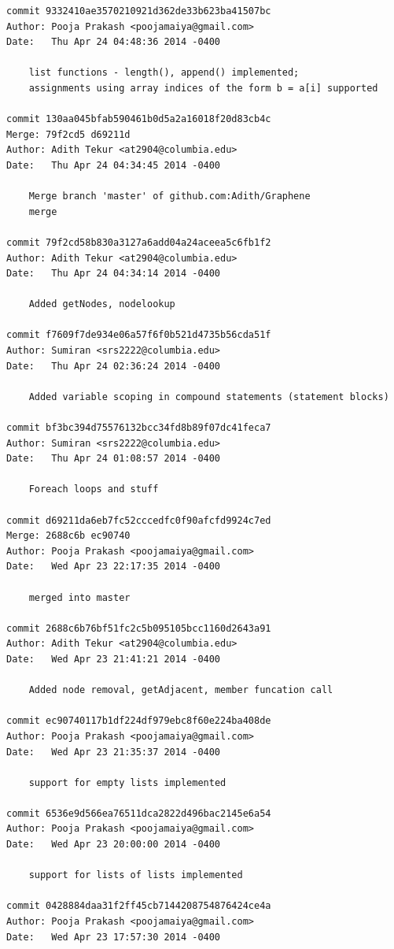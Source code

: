 \documentclass[a4paper]{article}
\begin{document}
\begin{verbatim}
commit 9332410ae3570210921d362de33b623ba41507bc
Author: Pooja Prakash <poojamaiya@gmail.com>
Date:   Thu Apr 24 04:48:36 2014 -0400

    list functions - length(), append() implemented; 
    assignments using array indices of the form b = a[i] supported

commit 130aa045bfab590461b0d5a2a16018f20d83cb4c
Merge: 79f2cd5 d69211d
Author: Adith Tekur <at2904@columbia.edu>
Date:   Thu Apr 24 04:34:45 2014 -0400

    Merge branch 'master' of github.com:Adith/Graphene
    merge

commit 79f2cd58b830a3127a6add04a24aceea5c6fb1f2
Author: Adith Tekur <at2904@columbia.edu>
Date:   Thu Apr 24 04:34:14 2014 -0400

    Added getNodes, nodelookup

commit f7609f7de934e06a57f6f0b521d4735b56cda51f
Author: Sumiran <srs2222@columbia.edu>
Date:   Thu Apr 24 02:36:24 2014 -0400

    Added variable scoping in compound statements (statement blocks)

commit bf3bc394d75576132bcc34fd8b89f07dc41feca7
Author: Sumiran <srs2222@columbia.edu>
Date:   Thu Apr 24 01:08:57 2014 -0400

    Foreach loops and stuff

commit d69211da6eb7fc52cccedfc0f90afcfd9924c7ed
Merge: 2688c6b ec90740
Author: Pooja Prakash <poojamaiya@gmail.com>
Date:   Wed Apr 23 22:17:35 2014 -0400

    merged into master

commit 2688c6b76bf51fc2c5b095105bcc1160d2643a91
Author: Adith Tekur <at2904@columbia.edu>
Date:   Wed Apr 23 21:41:21 2014 -0400

    Added node removal, getAdjacent, member funcation call

commit ec90740117b1df224df979ebc8f60e224ba408de
Author: Pooja Prakash <poojamaiya@gmail.com>
Date:   Wed Apr 23 21:35:37 2014 -0400

    support for empty lists implemented

commit 6536e9d566ea76511dca2822d496bac2145e6a54
Author: Pooja Prakash <poojamaiya@gmail.com>
Date:   Wed Apr 23 20:00:00 2014 -0400

    support for lists of lists implemented

commit 0428884daa31f2ff45cb7144208754876424ce4a
Author: Pooja Prakash <poojamaiya@gmail.com>
Date:   Wed Apr 23 17:57:30 2014 -0400


\end{verbatim}
\end{document}
